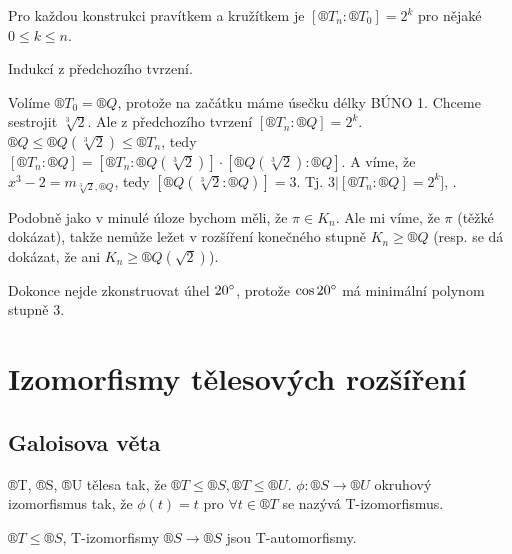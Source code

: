 \documentclass[12pt]{article}                   %
\begin{document}
    \begin{tvrzeni}
        Pro každou konstrukci pravítkem a kružítkem je $[®T_n : ®T_0] = 2^k$ pro nějaké $0 ≤ k ≤ n$.

        \begin{dukazin}
            Indukcí z předchozího tvrzení.
        \end{dukazin}
    \end{tvrzeni}

    \begin{priklad}
        Volíme $®T_0 = ®Q$, protože na začátku máme úsečku délky BÚNO 1. Chceme sestrojit $\sqrt[3]{2}$. Ale z předchozího tvrzení $[®T_n : ®Q] = 2^k$. $®Q ≤ ®Q(\sqrt[3]{2}) ≤ ®T_n$, tedy $[®T_n : ®Q] = [®T_n : ®Q(\sqrt[3]{2})]·[®Q(\sqrt[3]{2}) : ®Q]$. A víme, že $x^3 - 2 = m_{\sqrt[3]{2}, ®Q}$, tedy $[®Q(\sqrt[3]{2} :®Q)] = 3$. Tj. $3 | [®T_n : ®Q] = 2^k]$, \lightning.
    \end{priklad}

    \begin{priklad}
        Podobně jako v minulé úloze bychom měli, že $\pi \in K_n$. Ale mi víme, že $\pi$ (těžké dokázat), takže nemůže ležet v rozšíření konečného stupně $K_n ≥ ®Q$ (resp. se dá dokázat, že ani $K_n ≥ ®Q(\sqrt{2})$).
    \end{priklad}

    \begin{priklad}
        Dokonce nejde zkonstruovat úhel $20^{\circ}$, protože $\cos 20^{\circ}$ má minimální polynom stupně 3.
    \end{priklad}

\section{Izomorfismy tělesových rozšíření}
    \subsection{Galoisova věta}
        \begin{definice}[T-izomorfismus]
            ®T, ®S, ®U tělesa tak, že $®T ≤ ®S, ®T ≤ ®U$. $\phi: ®S \rightarrow ®U$ okruhový izomorfismus tak, že $\phi(t) = t$ pro $\forall t \in ®T$ se nazývá T-izomorfismus.
        \end{definice}

        \begin{definice}
            $®T ≤ ®S$, T-izomorfismy $®S \rightarrow ®S$ jsou T-automorfismy.
        \end{definice}
\end{document}
